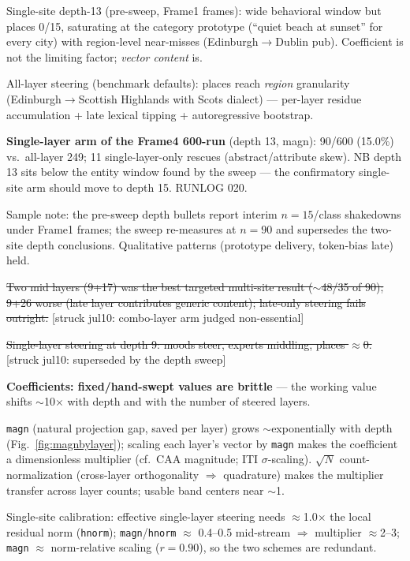 \begin{outline}
\item [+] Single-site depth-13 (pre-sweep, Frame1 frames): wide behavioral window but places 0/15, saturating at the category prototype (``quiet beach at sunset'' for every city) with region-level near-misses (Edinburgh$\to$Dublin pub). Coefficient is not the limiting factor; \emph{vector content} is.
\item [+] All-layer steering (benchmark defaults): places reach \emph{region} granularity (Edinburgh$\to$Scottish Highlands with Scots dialect) --- per-layer residue accumulation + late lexical tipping + autoregressive bootstrap.
\item [+] \textbf{Single-layer arm of the Frame4 600-run} (depth 13, magn): 90/600 (15.0\%) vs.\ all-layer 249; 11 single-layer-only rescues (abstract/attribute skew). NB depth 13 sits below the entity window found by the sweep --- the confirmatory single-site arm should move to depth 15. RUNLOG 020.
\item [?] Sample note: the pre-sweep depth bullets report interim $n{=}15$/class shakedowns under Frame1 frames; the sweep re-measures at $n{=}90$ and supersedes the two-site depth conclusions. Qualitative patterns (prototype delivery, token-bias late) held.
\item [--] \sout{Two mid layers (9+17) was the best targeted multi-site result ($\sim$48/35 of 90); 9+26 worse (late layer contributes generic content); late-only steering fails outright.} [struck jul10: combo-layer arm judged non-essential]
\item [--] \sout{Single-layer steering at depth 9: moods steer, experts middling, places $\approx$0.} [struck jul10: superseded by the depth sweep]
\item [+] \textbf{Coefficients: fixed/hand-swept values are brittle} --- the working value shifts $\sim$10$\times$ with depth and with the number of steered layers.
\item [+] \texttt{magn} (natural projection gap, saved per layer) grows $\sim$exponentially with depth (Fig.~\ref{fig:magnbylayer}); scaling each layer's vector by \texttt{magn} makes the coefficient a dimensionless multiplier (cf.\ CAA magnitude; ITI $\sigma$-scaling). $\sqrt{N}$ count-normalization (cross-layer orthogonality $\Rightarrow$ quadrature) makes the multiplier transfer across layer counts; usable band centers near $\sim$1.
\item [+] Single-site calibration: effective single-layer steering needs $\approx$1.0$\times$ the local residual norm (\texttt{hnorm}); \texttt{magn}/\texttt{hnorm} $\approx$ 0.4--0.5 mid-stream $\Rightarrow$ multiplier $\approx$2--3; \texttt{magn} $\approx$ norm-relative scaling ($r{=}0.90$), so the two schemes are redundant.

\end{outline}
